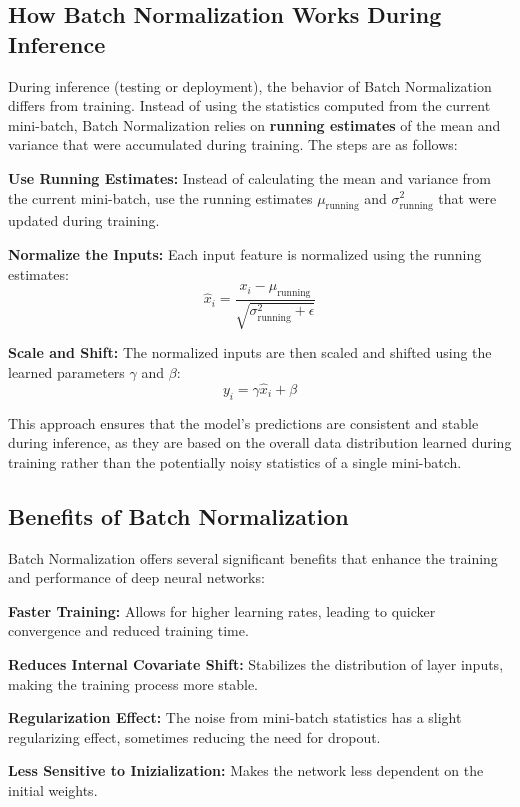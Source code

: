 \subsection{How Batch Normalization Works During Inference}
During inference (testing or deployment), the behavior of Batch Normalization differs from training. Instead of using the statistics computed from the current mini-batch, Batch Normalization relies on \textbf{running estimates} of the mean and variance that were accumulated during training. The steps are as follows:
\begin{compactitemize}
    \item \textbf{Use Running Estimates:} Instead of calculating the mean and variance from the current mini-batch, use the running estimates \(\mu_{\text{running}}\) and \(\sigma_{\text{running}}^2\) that were updated during training.
    \item \textbf{Normalize the Inputs:} Each input feature is normalized using the running estimates:
    \[
    \hat{x}_i = \frac{x_i - \mu_{\text{running}}}{\sqrt{\sigma_{\text{running}}^2 + \epsilon}}
    \]
    \item \textbf{Scale and Shift:} The normalized inputs are then scaled and shifted using the learned parameters \(\gamma\) and \(\beta\):
    \[
    y_i = \gamma \hat{x}_i + \beta
    \]
\end{compactitemize}
This approach ensures that the model's predictions are consistent and stable during inference, as they are based on the overall data distribution learned during training rather than the potentially noisy statistics of a single mini-batch.

\subsection{Benefits of Batch Normalization}
Batch Normalization offers several significant benefits that enhance the training and performance of deep neural networks:
\begin{compactitemize}
    \item \textbf{Faster Training:} Allows for higher learning rates, leading to quicker convergence and reduced training time.
    \item \textbf{Reduces Internal Covariate Shift:} Stabilizes the distribution of layer inputs, making the training process more stable.
    \item \textbf{Regularization Effect:} The noise from mini-batch statistics has a slight regularizing effect, sometimes reducing the need for dropout.
    \item \textbf{Less Sensitive to Inizialization:} Makes the network less dependent on the initial weights.
\end{compactitemize}